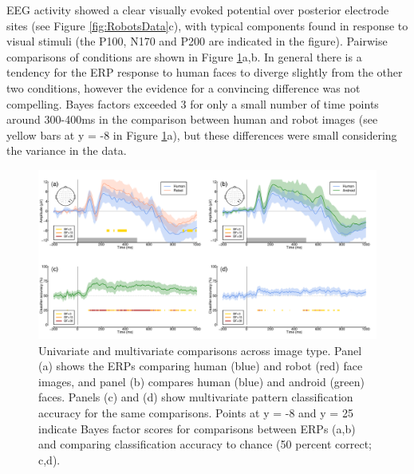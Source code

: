 \documentclass[
]{article}
\begin{document}
EEG activity showed a clear visually evoked potential over posterior electrode sites (see Figure \ref{fig:RobotsData}c), with typical components found in response to visual stimuli (the P100, N170 and P200 are indicated in the figure). Pairwise comparisons of conditions are shown in Figure \ref{fig:RobotsMVPA}a,b. In general there is a tendency for the ERP response to human faces to diverge slightly from the other two conditions, however the evidence for a convincing difference was not compelling. Bayes factors exceeded 3 for only a small number of time points around 300-400ms in the comparison between human and robot images (see yellow bars at y = -8 in Figure \ref{fig:RobotsMVPA}a), but these differences were small considering the variance in the data.

\begin{figure}

{\centering \includegraphics{Figures/RobotsMVPA} 

}

\caption{Univariate and multivariate comparisons across image type. Panel (a) shows the ERPs comparing human (blue) and robot (red) face images, and panel (b) compares human (blue) and android (green) faces. Panels (c) and (d) show multivariate pattern classification accuracy for the same comparisons. Points at y = -8 and y = 25 indicate Bayes factor scores for comparisons between ERPs (a,b) and comparing classification accuracy to chance (50 percent correct; c,d).}\label{fig:RobotsMVPA}
\end{figure}
\end{document}
